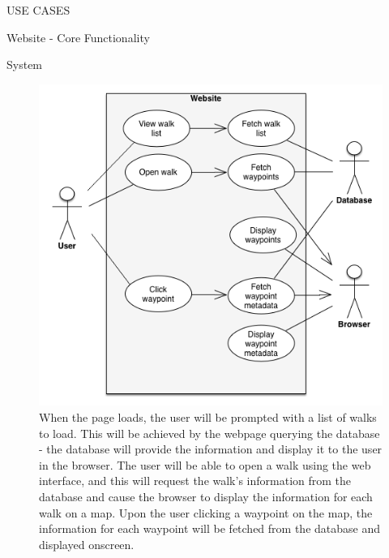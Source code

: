 \documentclass{article}
\begin{document}
\begin{section}{USE CASES}
		\clearpage
		\begin{subsection}{Website - Core Functionality}
			\begin{subsubsection}{System}
				\begin{figure}[h!]
					\begin{center}
						\includegraphics[height=0.75\columnwidth]{images/UseCase/Website/Core/Website.png}
					\end{center}
					\caption{When the page loads, the user will be prompted with a list of walks to load. This will be achieved by the webpage querying the database - the database will provide the information and display it to the user in the browser. The user will be able to open a walk using the web interface, and this will request the walk's information from the database and cause the browser to display the information for each walk on a map. Upon the user clicking a waypoint on the map, the information for each waypoint will be fetched from the database and displayed onscreen.}
				\end{figure}
			\end{subsubsection}
		\end{subsection}
		

\end{section}
\end{document}
